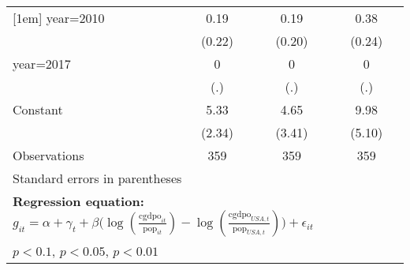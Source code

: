 \begin{sidewaystable}[htbp]
\begin{tabular}{l*{3}{c}}
[1em]
year=2010       &     0.19         &     0.19         &     0.38         \\
                &   (0.22)         &   (0.20)         &   (0.24)         \\
[1em]
year=2017       &        0         &        0         &        0         \\
                &      (.)         &      (.)         &      (.)         \\
[1em]
Constant        &     5.33\sym{**} &     4.65         &     9.98\sym{*}  \\
                &   (2.34)         &   (3.41)         &   (5.10)         \\
\hline
Observations    &      359         &      359         &      359         \\
\hline\hline
\multicolumn{4}{l}{\footnotesize Standard errors in parentheses}\\
\multicolumn{4}{l}{\footnotesize \textbf{Regression equation:} \(g_{it} = \alpha + \gamma_t + \beta \big(\log (\frac{\textrm{cgdpo}_{it}}{\textrm{pop}_{it}} ) - \log (\frac{\textrm{cgdpo}_{USA,t}}{\textrm{pop}_{USA,t}}  ) \big) + \epsilon_{it}\)}\\
\multicolumn{4}{l}{\footnotesize \sym{*} \(p<0.1\), \sym{**} \(p<0.05\), \sym{***} \(p<0.01\)}\\
\end{tabular}
\end{sidewaystable}
